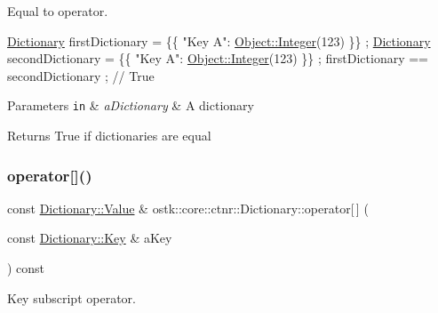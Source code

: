 Equal to operator. 


\begin{DoxyCode}
\hyperlink{classostk_1_1core_1_1ctnr_1_1_dictionary_a17166f1489683b8fcc5da6537f29de13}{Dictionary} firstDictionary = \{\{ \textcolor{stringliteral}{"Key A"}: \hyperlink{classostk_1_1core_1_1ctnr_1_1_object_af3bef3ae331e8e55662bf91a4cd5026f}{Object::Integer}(123) \}\} ;
\hyperlink{classostk_1_1core_1_1ctnr_1_1_dictionary_a17166f1489683b8fcc5da6537f29de13}{Dictionary} secondDictionary = \{\{ \textcolor{stringliteral}{"Key A"}: \hyperlink{classostk_1_1core_1_1ctnr_1_1_object_af3bef3ae331e8e55662bf91a4cd5026f}{Object::Integer}(123) \}\} ;
firstDictionary == secondDictionary ; \textcolor{comment}{// True}
\end{DoxyCode}



\begin{DoxyParams}[1]{Parameters}
\mbox{\tt in}  & {\em a\+Dictionary} & A dictionary \\
\hline
\end{DoxyParams}
\begin{DoxyReturn}{Returns}
True if dictionaries are equal 
\end{DoxyReturn}
\mbox{\label{classostk_1_1core_1_1ctnr_1_1_dictionary_ab1493480bb63749fb79e374b56a9719d}} 
\subsubsection{\texorpdfstring{operator[]()}{operator[]()}\hspace{0.1cm}{\footnotesize\ttfamily [1/2]}}
{\footnotesize\ttfamily const \hyperlink{classostk_1_1core_1_1ctnr_1_1_dictionary_ace6ab82268031e972455affca8730c9c}{Dictionary\+::\+Value} \& ostk\+::core\+::ctnr\+::\+Dictionary\+::operator\mbox{[}$\,$\mbox{]} (\begin{DoxyParamCaption}\item[{const \hyperlink{classostk_1_1core_1_1ctnr_1_1_dictionary_aa3b171525039535f342d271d27f90407}{Dictionary\+::\+Key} \&}]{a\+Key }\end{DoxyParamCaption}) const}



Key subscript operator. 


